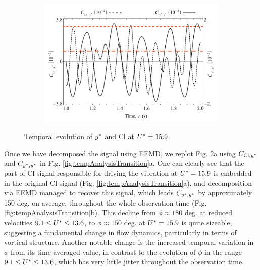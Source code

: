 \documentclass[oneside]{utmthesis}
\begin{document}
\begin{figure}
  \begin{subfigure}[h]{0.98\textwidth}
    \includegraphics[width=\textwidth]{figs/tempEvoCompare-b}
    \caption{}
    \label{fig:tempEvoCompare-b}
  \end{subfigure}
  \caption{Temporal evolution of $y^{*}$ and Cl at $U^{*} = 15.9$.} \label{fig:tempEvoCompare}
\end{figure}

Once we have decomposed the signal using EEMD, we replot Fig. \ref{fig:tempEvoCompare}a using $C_{\text{Cl},y^{*}}$ and $C_{y^{*},y^{*}}$ in Fig. \ref{fig:tempAnalysisTransition}a. One can clearly see that the part of Cl signal responsible for driving the vibration at  $U^{*} = 15.9$ is embedded in the original Cl signal (Fig. \ref{fig:tempAnalysisTransition}a), and decomposition via EEMD managed to recover this signal, which leads $C_{y^{*},y^{*}}$ by approximately 150 deg. on average, throughout the whole observation time (Fig. \ref{fig:tempAnalysisTransition}b). This decline from $\phi \approx 180$ deg. at reduced velocities $9.1 \leq U^{*} \leq 13.6$, to $\phi \approx 150$ deg. at $U^{*} = 15.9$ is quite sizeable, suggesting a fundamental change in flow dynamics, particularly in terms of vortical structure. Another notable change is the increased temporal variation in $\phi$ from its time-averaged value, in contrast to the evolution of $\phi$ in the range $9.1 \leq U^{*} \leq 13.6$, which has very little jitter throughout the observation time.
\end{document}
